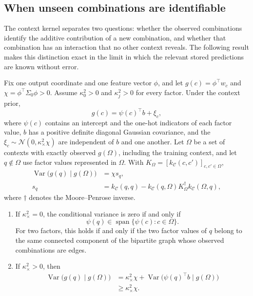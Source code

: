 \subsection{When unseen combinations are identifiable}
\label{sec:composition-theory}

The context kernel separates two questions: whether the observed combinations identify the additive contribution of a new combination, and whether that combination has an interaction that no other context reveals. The following result makes this distinction exact in the limit in which the relevant stored predictions are known without error.

\begin{proposition}
\label{prop:composition}
Fix one output coordinate and one feature vector $\phi$, and let $g(c)=\phi^\top w_c$ and $\chi=\phi^\top\Sigma_0\phi>0$. Assume $\kappa_0^2>0$ and $\kappa_j^2>0$ for every factor. Under the context prior,
\[
g(c)=\psi(c)^\top b+\xi_c,
\]
where $\psi(c)$ contains an intercept and the one-hot indicators of each factor value, $b$ has a positive definite diagonal Gaussian covariance, and the $\xi_c\sim\mathcal N(0,\kappa_\times^2\chi)$ are independent of $b$ and one another. Let $\Omega$ be a set of contexts with exactly observed $g(\Omega)$, including the training context, and let $q\notin\Omega$ use factor values represented in $\Omega$. With $K_\Omega=[k_{\mathcal C}(c,c')]_{c,c'\in\Omega}$,
\begin{align}
\operatorname{Var}\bigl(g(q)\mid g(\Omega)\bigr)&=\chi s_q,\label{eq:composition-variance}\\
s_q&=k_{\mathcal C}(q,q)-k_{\mathcal C}(q,\Omega)K_\Omega^\dagger k_{\mathcal C}(\Omega,q),\nonumber
\end{align}
where $\dagger$ denotes the Moore--Penrose inverse.
\begin{enumerate}[label=(\roman*)]
\item If $\kappa_\times^2=0$, the conditional variance is zero if and only if
\[
\psi(q)\in\operatorname{span}\{\psi(c):c\in\Omega\}.
\]
For two factors, this holds if and only if the two factor values of $q$ belong to the same connected component of the bipartite graph whose observed combinations are edges.
\item If $\kappa_\times^2>0$, then
\begin{align*}
\operatorname{Var}\bigl(g(q)\mid g(\Omega)\bigr)
&=\kappa_\times^2\chi
+\operatorname{Var}\bigl(\psi(q)^\top b\mid g(\Omega)\bigr)\\
&\geq\kappa_\times^2\chi.
\end{align*}
\end{enumerate}
\end{proposition}

